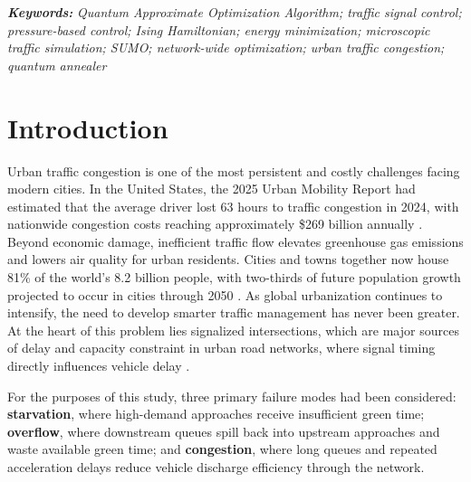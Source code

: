 \textbf{\textit{Keywords:}} \textit{Quantum Approximate Optimization Algorithm; traffic signal control; pressure-based control; Ising Hamiltonian; energy minimization; microscopic traffic simulation; SUMO; network-wide optimization; urban traffic congestion; quantum annealer}


\section{Introduction}

Urban traffic congestion is one of the most persistent and costly challenges facing modern cities. In the United States, the 2025 Urban Mobility Report had estimated that the average driver lost 63 hours to traffic congestion in 2024, with nationwide congestion costs reaching approximately \$269 billion annually \cite{schrank2025}. Beyond economic damage, inefficient traffic flow elevates greenhouse gas emissions and lowers air quality for urban residents. Cities and towns together now house 81\% of the world's 8.2 billion people, with two-thirds of future population growth projected to occur in cities through 2050 \cite{un2025}. As global urbanization continues to intensify, the need to develop smarter traffic management has never been greater. At the heart of this problem lies signalized intersections, which are major sources of delay and capacity constraint in urban road networks, where signal timing directly influences vehicle delay \cite{varaiya2013}.

For the purposes of this study, three primary failure modes had been considered:
\textbf{starvation}, where high-demand approaches receive insufficient green
time; \textbf{overflow}, where downstream queues spill back into upstream
approaches and waste available green time; and \textbf{congestion}, where long
queues and repeated acceleration delays reduce vehicle discharge efficiency
through the network.

